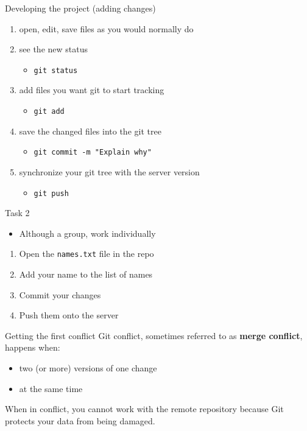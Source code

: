 \documentclass[14pt]{beamer}
\begin{document}
	\begin{frame}{Developing the project (adding changes)}
		\begin{enumerate}
		\item open, edit, save files as you would normally do
		\item see the new status
	        \begin{itemize}
		    \item \texttt{git status}
	        \end{itemize}
		\item add files you want git to start tracking
	        \begin{itemize}
		    \item \texttt{git add}
	        \end{itemize}
		\item save the changed files into the git tree
	        \begin{itemize}
		    \item \texttt{git commit -m "Explain why"}
	        \end{itemize}
		\item synchronize your git tree with the server version
	        \begin{itemize}
		    \item \texttt{git push}
	        \end{itemize}
		\end{enumerate}
	\end{frame}

	\begin{frame}{Task 2}
	    \begin{itemize}
		\item Although a group, work individually
	    \end{itemize}
	    \begin{enumerate}
		\item Open the \texttt{names.txt} file in the repo
		\item Add your name to the list of names
		\item Commit your changes
		\item Push them onto the server
	    \end{enumerate}
	\end{frame}

	\begin{frame}{Getting the first conflict}
	Git conflict, sometimes referred to as \textbf{merge conflict}, happens when:
	
	\vspace{5pt}
	
	\begin{itemize}
		\item two (or more) versions of one change
		\item at the same time
	\end{itemize}

	\vspace{5pt}
	
	When in conflict, you cannot work with the remote repository because Git protects your data from being damaged.

\end{frame}
\end{document}
